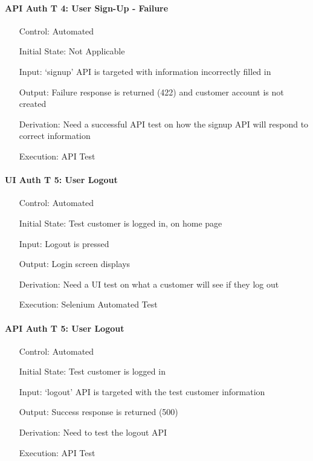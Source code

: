 \documentclass[12pt, titlepage]{article}
\begin{document}
\paragraph*{API Auth T 4: User Sign-Up - Failure}
\begin{itemize}
	\item[Control:] Automated
	\item[Initial State:] Not Applicable
	\item[Input:] `signup' API is targeted with information incorrectly filled in
	\item[Output:] Failure response is returned (422) and customer account is not created
	\item[Derivation:] Need a successful API test on how the signup API will respond to correct information
	\item[Execution:] API Test
\end{itemize}

\paragraph*{UI Auth T 5: User Logout}
\begin{itemize}
	\item[Control:] Automated
	\item[Initial State:] Test customer is logged in, on home page
	\item[Input:] Logout is pressed
	\item[Output:] Login screen displays
	\item[Derivation:] Need a UI test on what a customer will see if they log out
	\item[Execution:] Selenium Automated Test
\end{itemize}

\paragraph*{API Auth T 5: User Logout}
\begin{itemize}
	\item[Control:] Automated
	\item[Initial State:] Test customer is logged in
	\item[Input:] `logout' API is targeted with the test customer information
	\item[Output:] Success response is returned (500)
	\item[Derivation:] Need to test the logout API
	\item[Execution:] API Test
\end{itemize}
\end{document}
